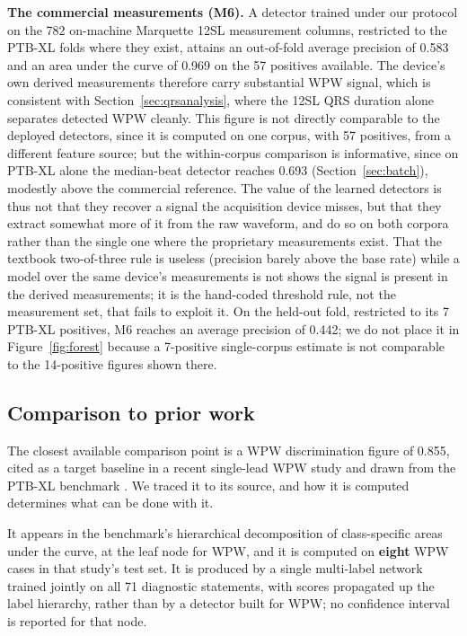 \documentclass[11pt]{article}
\begin{document}
\textbf{The commercial measurements (M6).} A detector trained under our protocol on the 782 on-machine Marquette 12SL measurement columns, restricted to the PTB-XL folds where they exist, attains an out-of-fold average precision of 0.583 and an area under the curve of 0.969 on the 57 positives available. The device's own derived measurements therefore carry substantial WPW signal, which is consistent with Section~\ref{sec:qrsanalysis}, where the 12SL QRS duration alone separates detected WPW cleanly. This figure is not directly comparable to the deployed detectors, since it is computed on one corpus, with 57 positives, from a different feature source; but the within-corpus comparison is informative, since on PTB-XL alone the median-beat detector reaches 0.693 (Section~\ref{sec:batch}), modestly above the commercial reference. The value of the learned detectors is thus not that they recover a signal the acquisition device misses, but that they extract somewhat more of it from the raw waveform, and do so on both corpora rather than the single one where the proprietary measurements exist. That the textbook two-of-three rule is useless (precision barely above the base rate) while a model over the same device's measurements is not shows the signal is present in the derived measurements; it is the hand-coded threshold rule, not the measurement set, that fails to exploit it. On the held-out fold, restricted to its 7 PTB-XL positives, M6 reaches an average precision of 0.442; we do not place it in Figure~\ref{fig:forest} because a 7-positive single-corpus estimate is not comparable to the 14-positive figures shown there.

\subsection{Comparison to prior work}
\label{sec:prior}

The closest available comparison point is a WPW discrimination figure of 0.855, cited as a target baseline in a recent single-lead WPW study \cite{leadi} and drawn from the PTB-XL benchmark \cite{strodthoff}. We traced it to its source, and how it is computed determines what can be done with it.

It appears in the benchmark's hierarchical decomposition of class-specific areas under the curve, at the leaf node for WPW, and it is computed on \textbf{eight} WPW cases in that study's test set. It is produced by a single multi-label network trained jointly on all 71 diagnostic statements, with scores propagated up the label hierarchy, rather than by a detector built for WPW; no confidence interval is reported for that node.
\end{document}
